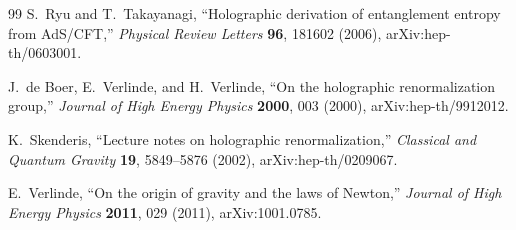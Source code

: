 \documentclass[11pt,letterpaper]{article}
\theoremstyle{plain}
\begin{document}
\begin{thebibliography}{99}
S.~Ryu and T.~Takayanagi,
``Holographic derivation of entanglement entropy from AdS/CFT,''
\textit{Physical Review Letters} \textbf{96}, 181602 (2006),
arXiv:hep-th/0603001.

J.~de Boer, E.~Verlinde, and H.~Verlinde,
``On the holographic renormalization group,''
\textit{Journal of High Energy Physics} \textbf{2000}, 003 (2000),
arXiv:hep-th/9912012.

K.~Skenderis,
``Lecture notes on holographic renormalization,''
\textit{Classical and Quantum Gravity} \textbf{19}, 5849--5876 (2002),
arXiv:hep-th/0209067.

E.~Verlinde,
``On the origin of gravity and the laws of Newton,''
\textit{Journal of High Energy Physics} \textbf{2011}, 029 (2011),
arXiv:1001.0785.

\end{thebibliography}
\end{document}
